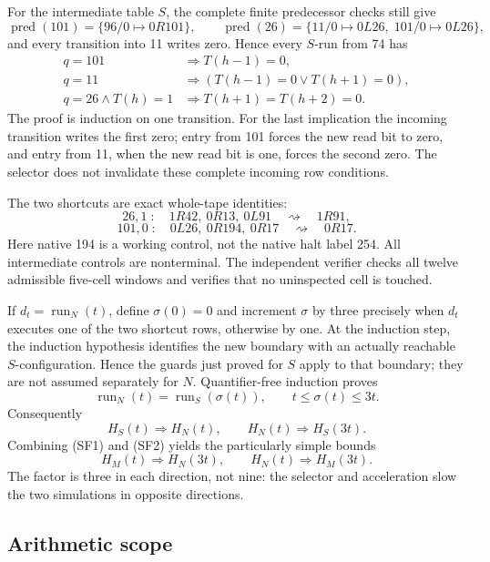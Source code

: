 For the intermediate table $S$, the complete finite predecessor checks
still give
\[
 \operatorname{pred}(101)=\{96/0\mapsto0R101\},\qquad
 \operatorname{pred}(26)=\{11/0\mapsto0L26,\;101/0\mapsto0L26\},
\]
and every transition into 11 writes zero. Hence every $S$-run from 74 has
\[
\begin{split}
 q=101&\Rightarrow T(h-1)=0,\\
 q=11&\Rightarrow (T(h-1)=0\lor T(h+1)=0),\\
 q=26\land T(h)=1&\Rightarrow T(h+1)=T(h+2)=0.
\end{split}
\]
The proof is induction on one transition. For the last implication the
incoming transition writes the first zero; entry from 101 forces the new
read bit to zero, and entry from 11, when the new read bit is one, forces
the second zero. The selector does not invalidate these complete incoming
row conditions.

The two shortcuts are exact whole-tape identities:
\[
 26,1\;:\quad 1R42,\ 0R13,\ 0L91
       \quad\rightsquigarrow\quad 1R91,
\]
\[
 101,0\;:\quad 0L26,\ 0R194,\ 0R17
       \quad\rightsquigarrow\quad 0R17.
\]
Here native 194 is a working control, not the native halt label 254.
All intermediate controls are nonterminal. The independent verifier checks
all twelve admissible five-cell windows and verifies that no uninspected
cell is touched.

If $d_t=\operatorname{run}_N(t)$, define $\sigma(0)=0$ and increment
$\sigma$ by three precisely when $d_t$ executes one of the two shortcut
rows, otherwise by one. At the induction step, the induction hypothesis identifies the new boundary
with an actually reachable $S$-configuration. Hence the guards just proved
for $S$ apply to that boundary; they are not assumed separately for $N$.
Quantifier-free induction proves
\[
 \operatorname{run}_N(t)=\operatorname{run}_S(\sigma(t)),\qquad
 t\leq\sigma(t)\leq3t.
\]
Consequently
\[
 H_S(t)\Longrightarrow H_N(t),\qquad
 H_N(t)\Longrightarrow H_S(3t).                \tag{SF2}
\]
Combining (SF1) and (SF2) yields the particularly simple bounds
\[
 \boxed{H_M(t)\Longrightarrow H_N(3t),\qquad
        H_N(t)\Longrightarrow H_M(3t).}
\]
The factor is three in each direction, not nine: the selector and
acceleration slow the two simulations in opposite directions.

\subsection{Arithmetic scope}

